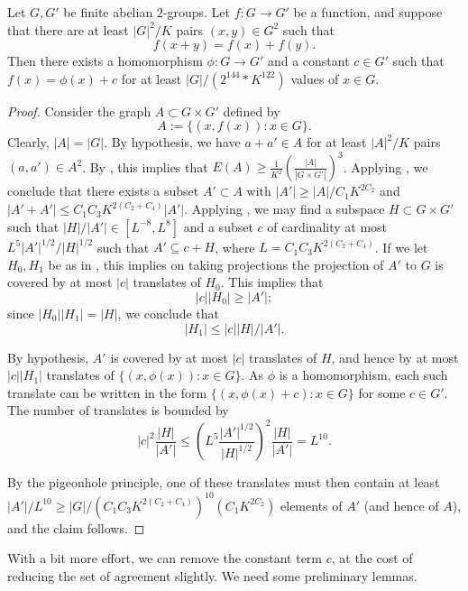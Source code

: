 \begin{theorem}\label{approx-hom-pfr}\leanok Let $G,G'$ be finite abelian $2$-groups.
  Let $f: G \to G'$ be a function, and suppose that there are at least $|G|^2 / K$ pairs $(x,y) \in G^2$ such that
$$ f(x+y) = f(x) + f(y).$$
Then there exists a homomorphism $\phi: G \to G'$ and a constant $c \in G'$
such that $f(x) = \phi(x)+c$ for at least $|G| / (2 ^ {144} * K ^ {122})$
values of $x \in G$.
\end{theorem}

\begin{proof}\leanok Consider the graph $A \subset G \times G'$ defined by
$$ A := \{ (x,f(x)): x \in G \}.$$
Clearly, $|A| = |G|$.  By hypothesis, we have $a+a' \in A$ for at least
$|A|^2/K$ pairs $(a,a') \in A^2$. By , this implies that
$E(A) \geq \frac{1}{K^2} \left( \frac{|A|}{|G \times G'|} \right)^3$.  Applying , we conclude that there exists a subset
$A' \subset A$ with $|A'| \geq |A|/C_1 K^{2C_2}$ and $|A'+A'| \leq C_1C_3
K^{2(C_2+C_4)} |A'|$. Applying , we may find a subspace $H
\subset G \times G'$ such that $|H| / |A'| \in [L^{-8}, L^{8}]$ and a subset
$c$ of cardinality at most $L^5 |A'|^{1/2} / |H|^{1/2}$ such that $A'
\subseteq c + H$, where $L =  C_1C_3 K^{2(C_2+C_4)}$. If we let $H_0,H_1$ be
as in , this implies on taking projections the projection of
$A'$ to $G$ is covered by at most $|c|$ translates of $H_0$.  This implies
that
$$ |c| |H_0| \geq |A'|;$$
since $|H_0| |H_1| = |H|$, we conclude that
$$ |H_1| \leq |c| |H|/|A'|.$$

By hypothesis, $A'$ is covered by at most $|c|$ translates of $H$, and hence
by at most $|c| |H_1|$ translates of $\{ (x,\phi(x)): x \in G \}$.  As $\phi$
is a homomorphism, each such translate can be written in the form $\{
(x,\phi(x)+c): x \in G \}$ for some $c \in G'$. The number of translates is
bounded by
$$
|c|^2 \frac{|H|}{|A'|} \leq \left(L^5 \frac{|A'|^{1/2}}{|H|^{1/2}}\right)^2 \frac{|H|}{|A'|} = L^{10}.
$$

By the pigeonhole principle, one of these translates must then contain at
least $|A'|/L^{10} \geq |G| / (C_1C_3 K^{2(C_2+C_4)})^{10} (C_1 K^{2C_2})$
elements of $A'$ (and hence of $A$), and the claim follows.
\end{proof}

With a bit more effort, we can remove the constant term $c$, at the cost of reducing the set of agreement slightly.  We need some preliminary lemmas.

